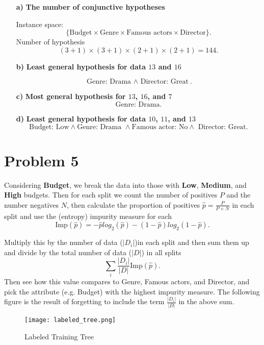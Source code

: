 \begin{itemize}
\item[ \textbf{a)} ] \textbf{The number of conjunctive hypotheses} 

    Instance space: 
    \[
      \{\text{Budget} \times \text{Genre} \times \text{Famous actors} \times
      \text{Director}\}
    .\] 
    Number of hypothesis
    \[
      (3+1)\times (3+1)\times (2+1)\times (2+1) = \boxed{144}
    .\] 
  \item[ \textbf{b)} ] \textbf{Least general hypothesis for data $13$ and $16$} 

    \[
      \boxed{\text{Genre: Drama } \wedge \text{ Director: Great}}
    .\] 
  \item[ \textbf{c)} ] \textbf{Most general hypothesis for $13$, $16$, and $7$} 
    \[
      \boxed{\text{Genre: Drama}}
    .\] 
  \item[ \textbf{d)} ] \textbf{Least general hypothesis for data $10$, $11$,
    and $13$}
    \[
      \boxed{\text{Budget: Low} \wedge \text{Genre: Drama } \wedge \text{Famous
      actor: No} \wedge \text{ Director: Great}}
    .\] 
\end{itemize}

\section{Problem 5}%

Considering \textbf{Budget}, we break the data into those with \textbf{Low},
\textbf{Medium}, and \textbf{High} budgets. Then for each split we count the
number of positives $P$ and the number negatives $N$, then calculate the proportion
of positives $\hat{p} = \frac{P}{P+N}$ in each split and use the (entropy) impurity
measure for each
\[
  \text{Imp}(\hat{p}) = -\hat{p}log_2(\hat{p}) - (1-\hat{p})log_2(1-\hat{p})
.\] 

Multiply this by the number of data ($|D_{i}|$)in each split and then sum them up and
divide by the total number of data ($|D|$) in all splits
\[
  \sum_i \frac{|D_{i}|}{|D|}\text{Imp}(\hat{p})
.\] 
Then see how this value compares to Genre, Famous actors, and
Director, and pick the attribute (e.g. Budget) with the highest impurity measure.
The following figure is the result of forgetting to include the term
$\frac{|D_{i}|}{|D|}$ in the above sum. 

\begin{figure}[H]
  \centering
  \texttt{[image: labeled\_tree.png]}
  \caption{Labeled Training Tree}%
  \label{fig:labeled_tree}
\end{figure}

